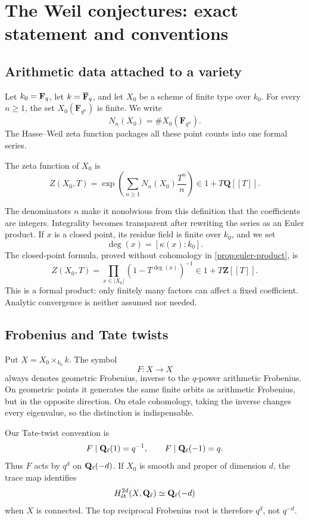 \chapter{The Weil conjectures: exact statement and conventions}
\label{chap:statement}

\section{Arithmetic data attached to a variety}

Let \(k_0=\mathbf F_q\), let \(k=\overline{\mathbf F}_q\), and let \(X_0\) be a scheme of finite
type over \(k_0\).  For every \(n\geq1\), the set
\(X_0(\mathbf F_{q^n})\) is finite.  We write
\[
  N_n(X_0)=\#X_0(\mathbf F_{q^n}).
\]
The Hasse--Weil zeta function packages all these point counts into one
formal series.

\begin{definition}
\label{def:hasse-weil-zeta}
The zeta function of \(X_0\) is
\[
 Z(X_0,T)
 =\exp\left(\sum_{n\geq1}N_n(X_0)\frac{T^n}{n}\right)
 \in1+T\mathbf Q[[T]].
\]
\end{definition}

The denominators \(n\) make it nonobvious from this definition that the
coefficients are integers.  Integrality becomes transparent after
rewriting the series as an Euler product.  If \(x\) is a closed point,
its residue field is finite over \(k_0\), and we set
\[
  \deg(x)=[\kappa(x):k_0].
\]
The closed-point formula, proved without cohomology in
\cref{prop:euler-product}, is
\[
  Z(X_0,T)=\prod_{x\in|X_0|}
       (1-T^{\deg(x)})^{-1}\in1+T\mathbf Z[[T]].
  \tag{1.1}\label{eq:zeta-euler-intro}
\]
This is a formal product: only finitely many factors can affect a fixed
coefficient.  Analytic convergence is neither assumed nor needed.

\section{Frobenius and Tate twists}

Put \(X=X_0\times_{k_0}k\).  The symbol
\[
 F\colon X\longrightarrow X
\]
always denotes geometric Frobenius, inverse to the \(q\)-power arithmetic
Frobenius.  On geometric points it generates the same finite orbits as
arithmetic Frobenius, but in the opposite direction.  On etale
cohomology, taking the inverse changes every eigenvalue, so the
distinction is indispensable.

\begin{convention}
Our Tate-twist convention is
\[
 F\mid\mathbf Q_\ell(1)=q^{-1},\qquad
 F\mid\mathbf Q_\ell(-1)=q.
\]
Thus \(F\) acts by \(q^d\) on \(\mathbf Q_\ell(-d)\).  If \(X_0\) is smooth and
proper of dimension \(d\), the trace map identifies
\[
 H^{2d}_{\mathrm{\acute et}}(X,\mathbf Q_\ell)\simeq\mathbf Q_\ell(-d)
\]
when \(X\) is connected.  The top reciprocal Frobenius root is therefore
\(q^d\), not \(q^{-d}\).
\end{convention}

